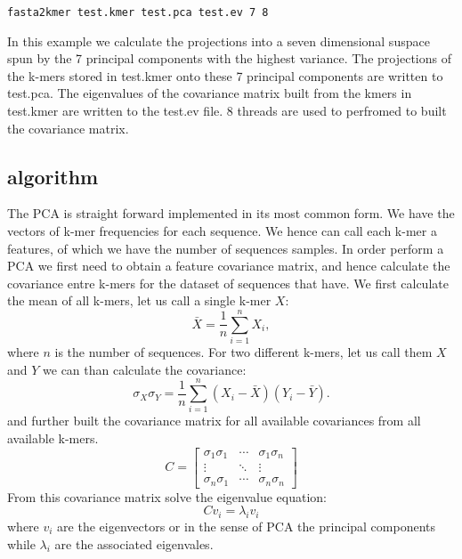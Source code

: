 \begin{lstlisting}
fasta2kmer test.kmer test.pca test.ev 7 8
\end{lstlisting}
In this example we calculate the projections into a seven dimensional
suspace spun by the 7 principal components with the highest
variance. The projections of the k-mers stored in test.kmer onto these
7 principal components are written to test.pca. The eigenvalues of the
covariance matrix built from the kmers in test.kmer are written to the
test.ev file. 8 threads are used to perfromed to built the covariance
matrix.

\subsection{algorithm}

The PCA is straight forward implemented in its most common form. We
have the vectors of k-mer frequencies for each sequence. We hence can
call each k-mer a features, of which we have the number of sequences
samples. In order perform a PCA we first need to obtain a feature
covariance matrix, and hence calculate the covariance entre k-mers for
the dataset of sequences that have. We first calculate the mean of all
k-mers, let us call a single k-mer $X$:
\begin{equation}
  \bar{X} = \frac{1}{n}\sum_{i=1}^{n}X_i,
\end{equation}
where $n$ is the number of sequences. For two different k-mers, let us
call them $X$ and $Y$ we can than calculate the covariance:
\begin{equation}
  \sigma_X\sigma_Y =
  \frac{1}{n}\sum_{i=1}^{n}(X_i-\bar{X})(Y_i-\bar{Y}). \label{eqn-covariance}
\end{equation}
and further built the covariance matrix for all available covariances
from all available k-mers.
\begin{equation}
  C = \left[
    \begin{array}{ccc}
      \sigma_1\sigma_1 & \cdots & \sigma_1\sigma_n \\
      \vdots & \ddots & \vdots \\
      \sigma_n\sigma_1 & \cdots & \sigma_n\sigma_n
    \end{array}
    \right] \label{eqn-covariance}
\end{equation}
From this covariance matrix solve the eigenvalue equation:
\begin{equation}
  Cv_i=\lambda_i v_i \label{eqn-eigen}
\end{equation}
where $v_i$ are the eigenvectors or in the sense of PCA the principal
components while $\lambda_i$ are the associated eigenvales.

